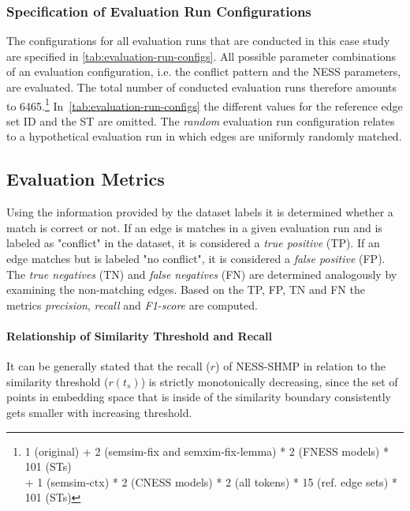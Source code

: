 \documentclass[11pt]{scrreprt}
\begin{document}
\subsubsection{Specification of Evaluation Run Configurations}
\label{sec:evaluation-configurations}
The configurations for all evaluation runs that are conducted in this case study are specified in \cref{tab:evaluation-run-configs}. All possible parameter combinations of an evaluation configuration, i.e. the conflict pattern and the NESS parameters, are evaluated. The total number of conducted evaluation runs therefore amounts to 6465.\footnote{1 (original) + 2 (semsim-fix and semxim-fix-lemma) * 2 (FNESS models) * 101 (STs) \\ + 1 (semsim-ctx) * 2 (CNESS models) * 2 (all tokens) * 15 (ref. edge sets) * 101 (STs)} In \cref{tab:evaluation-run-configs} the different values for the reference edge set ID and the ST are omitted. The \textit{random} evaluation run configuration relates to a hypothetical evaluation run in which edges are uniformly randomly matched. 


\subsection{Evaluation Metrics}
\label{sec:evaluation-metrics}
Using the information provided by the dataset labels it is determined whether a match is correct or not. If an edge is matches in a given evaluation run and is labeled as "conflict" in the dataset, it is considered a \textit{true positive} (TP). If an edge matches but is labeled "no conflict", it is considered a \textit{false positive} (FP). The \textit{true negatives} (TN) and \textit{false negatives} (FN) are determined analogously  by examining the non-matching edges. Based on the TP, FP, TN and FN the metrics \textit{precision}, \textit{recall} and \textit{F1-score} are computed. 

\paragraph{Relationship of Similarity Threshold and Recall}
It can be generally stated that the recall (\(r\)) of NESS-SHMP in relation to the similarity threshold (\(r(t_s)\)) is strictly monotonically decreasing, since the set of points in embedding space that is inside of the similarity boundary consistently gets smaller with increasing threshold. 
\end{document}
